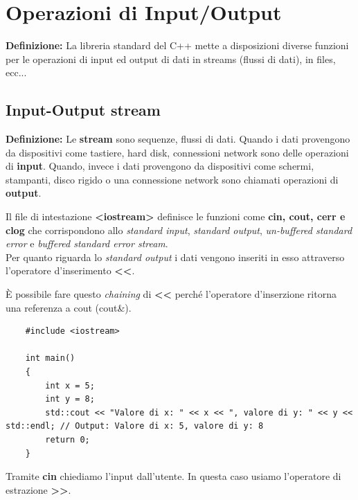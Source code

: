 
\newpage

\section{Operazioni di Input/Output}

\textsf{\small \textbf{Definizione: } La libreria standard del C++ mette a disposizioni diverse funzioni per le operazioni di input ed output di dati in streams (flussi di dati), in files, ecc...} \\

\subsection{Input-Output stream}

\textsf{\small \textbf{Definizione: } Le \textbf{stream} sono sequenze, flussi di dati. Quando i dati provengono da dispositivi come tastiere, hard disk, connessioni network sono delle operazioni di \textbf{input}. Quando, invece i dati provengono da dispositivi come schermi, stampanti, disco rigido o una connessione network sono chiamati operazioni di \textbf{output}.} \break

\textsf{\small Il file di intestazione \textbf{<iostream>} definisce le funzioni come \textbf{cin, cout, cerr e clog} che corrispondono allo \emph{standard input}, \emph{standard output}, \emph{un-buffered standard error} e \emph{buffered standard error stream}.} \\

\textsf{\small Per quanto riguarda lo \emph{standard output} i dati vengono inseriti in esso attraverso l'operatore d'inserimento \textbf{<<}.} \break

\textsf{\small È possibile fare questo \emph{chaining} di \textbf{<<} perché l'operatore d'inserzione ritorna una referenza a cout (cout\&).} \\

\begin{lstlisting}
	#include <iostream>
	
	int main()
	{
		int x = 5;
		int y = 8;
		std::cout << "Valore di x: " << x << ", valore di y: " << y << std::endl; // Output: Valore di x: 5, valore di y: 8
		return 0;
	}
\end{lstlisting}

\textsf{\small Tramite \textbf{cin} chiediamo l'input dall'utente. In questa caso usiamo l'operatore di estrazione \textbf{>>}.} \\

